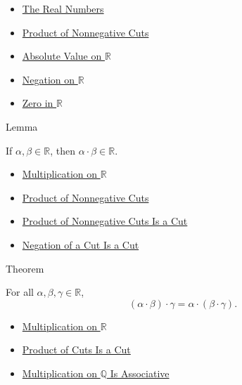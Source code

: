 \begin{dependencies}
\begin{itemize}
  \item \hyperref[def:reals]{The Real Numbers}
  \item \hyperref[def:product-nonnegative-on-r]{Product of Nonnegative Cuts}
  \item \hyperref[def:real-chapter-absolute-value-on-r]{Absolute Value on $\mathbb{R}$}
  \item \hyperref[def:negation-on-r]{Negation on $\mathbb{R}$}
  \item \hyperref[def:zero-in-r]{Zero in $\mathbb{R}$}
\end{itemize}
\end{dependencies}

\begin{lemmabox}{Lemma}
\begin{lemma}
\label{lem:product-of-cuts-is-a-cut}
If $\alpha,\beta\in\mathbb{R}$, then $\alpha\cdot\beta\in\mathbb{R}$.
\end{lemma}
\end{lemmabox}

\begin{dependencies}
\begin{itemize}
  \item \hyperref[def:multiplication-on-r]{Multiplication on $\mathbb{R}$}
  \item \hyperref[def:product-nonnegative-on-r]{Product of Nonnegative Cuts}
  \item \hyperref[lem:product-nonnegative-is-a-cut]{Product of Nonnegative Cuts Is a Cut}
  \item \hyperref[lem:negation-of-cut-is-a-cut]{Negation of a Cut Is a Cut}
\end{itemize}
\end{dependencies}

\begin{theorembox}{Theorem}
\begin{theorem}
\label{thm:multiplication-on-r-associative}
For all $\alpha,\beta,\gamma\in\mathbb{R}$,
\[
(\alpha\cdot\beta)\cdot\gamma=\alpha\cdot(\beta\cdot\gamma).
\]
\end{theorem}
\end{theorembox}

\begin{dependencies}
\begin{itemize}
  \item \hyperref[def:multiplication-on-r]{Multiplication on $\mathbb{R}$}
  \item \hyperref[lem:product-of-cuts-is-a-cut]{Product of Cuts Is a Cut}
  \item \hyperref[thm:multiplication-on-q-associative]{Multiplication on $\mathbb{Q}$ Is Associative}
\end{itemize}
\end{dependencies}

